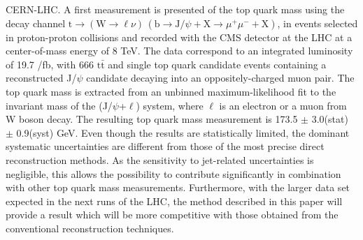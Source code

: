 CERN-LHC. A first measurement is presented of the top quark mass using the decay channel $\text{t}\to(\text{W}\to\ell\nu)\,(\text{b}\to\text{J}/\psi+\text{X}\to\mu^+\mu^-+\text{X})$, in events selected in proton-proton collisions and recorded with the CMS detector at the LHC at a center-of-mass energy of 8 TeV. The data correspond to an integrated luminosity of 19.7 /fb, with 666 $\text{t}\bar{\text{t}}$ and single top quark candidate events containing a reconstructed J/$\psi$ candidate decaying into an oppositely-charged muon pair. The top quark mass is extracted from an unbinned maximum-likelihood fit to the invariant mass of the (J/$\psi$+$\ell$) system, where $\ell$ is an electron or a muon from W boson decay. The resulting top quark mass measurement is 173.5 $\pm$ 3.0(stat) $\pm$ 0.9(syst) GeV. Even though the results are statistically limited, the dominant systematic uncertainties are different from those of the most precise direct reconstruction methods. As the sensitivity to jet-related uncertainties is negligible, this allows the possibility to contribute significantly in combination with other top quark mass measurements. Furthermore, with the larger data set expected in the next runs of the LHC, the method described in this paper will provide a result which will be more competitive with those obtained from the conventional reconstruction techniques.
